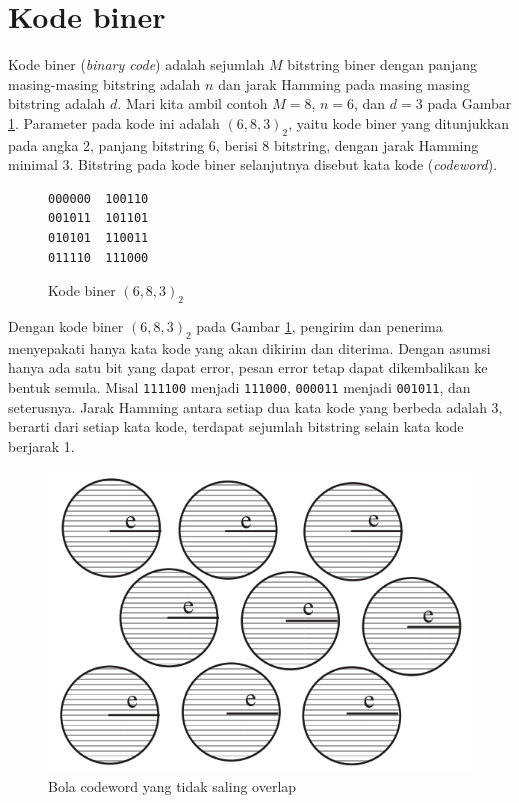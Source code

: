 \section{Kode biner}

Kode biner (\textit{binary code}) adalah sejumlah $M$ bitstring biner dengan panjang masing-masing bitstring adalah $n$ dan jarak Hamming pada masing masing bitstring adalah $d$. Mari kita ambil contoh $M=8$, $n=6$, dan $d=3$ pada Gambar \ref{fig:binarycode683}. Parameter pada kode ini adalah $(6,8,3)_2$, yaitu kode biner yang ditunjukkan pada angka 2, panjang bitstring 6, berisi 8 bitstring, dengan jarak Hamming minimal 3. Bitstring pada kode biner selanjutnya disebut kata kode (\textit{codeword}).

\begin{figure}
\centering
\begin{BVerbatim}
000000  100110
001011  101101
010101  110011
011110  111000
\end{BVerbatim}
\caption{Kode biner $(6,8,3)_2$}
\label{fig:binarycode683}
\end{figure}

Dengan kode biner $(6,8,3)_2$ pada Gambar \ref{fig:binarycode683}, pengirim dan penerima menyepakati hanya kata kode yang akan dikirim dan diterima. Dengan asumsi hanya ada satu bit yang dapat error, pesan error tetap dapat dikembalikan ke bentuk semula. Misal \texttt{111100} menjadi \texttt{111000}, \texttt{000011} menjadi \texttt{001011}, dan seterusnya. Jarak Hamming antara setiap dua kata kode yang berbeda adalah 3, berarti dari setiap kata kode, terdapat sejumlah bitstring selain kata kode berjarak 1.

\begin{figure}
\centering
\includegraphics[scale=0.6]{../img/codewordsball.png}
\caption{Bola codeword yang tidak saling overlap}
\label{fig:codewordsball}
\end{figure}

